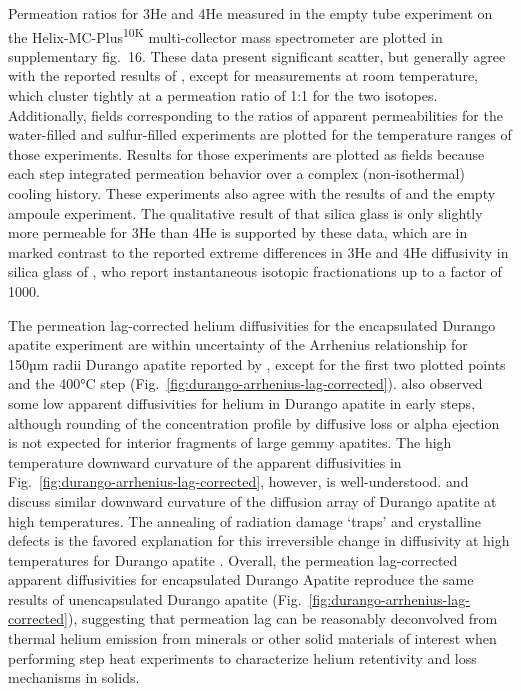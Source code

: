 Permeation ratios for 3He and 4He measured in the empty tube experiment on the Helix-MC-Plus\textsuperscript{10K} multi-collector mass spectrometer are plotted in supplementary fig.~16. These data present significant scatter, but generally agree with the reported results of \citet{jones1953}, except for measurements at room temperature, which cluster tightly at a permeation ratio of 1:1 for the two isotopes. Additionally, fields corresponding to the ratios of apparent permeabilities for the water-filled and sulfur-filled experiments are plotted for the temperature ranges of those experiments. Results for those experiments are plotted as fields because each step integrated permeation behavior over a complex (non-isothermal) cooling history. These experiments also agree with the results of \citet{jones1953} and the empty ampoule experiment. The qualitative result of \citet{jones1953} that silica glass is only slightly more permeable for 3He than 4He is supported by these data, which are in marked contrast to the reported extreme differences in 3He and 4He diffusivity in silica glass of \citet{mcmurtry2019}, who report instantaneous isotopic fractionations up to a factor of 1000.

The permeation lag-corrected helium diffusivities for the encapsulated Durango apatite experiment are within uncertainty of the Arrhenius relationship for 150µm radii Durango apatite reported by \citet{farley2000}, except for the first two plotted points and the 400°C step (Fig.~\ref{fig:durango-arrhenius-lag-corrected}). \citet{farley2000} also observed some low apparent diffusivities for helium in Durango apatite in early steps, although rounding of the concentration profile by diffusive loss or alpha ejection is not expected for interior fragments of large gemmy apatites. The high temperature downward curvature of the apparent diffusivities in Fig.~\ref{fig:durango-arrhenius-lag-corrected}, however, is well-understood. \citet{wolf1996} and \citet{farley2000} discuss similar downward curvature of the diffusion array of Durango apatite at high temperatures. The annealing of radiation damage `traps' and crystalline defects is the favored explanation for this irreversible change in diffusivity at high temperatures for Durango apatite \citep{farley2000,shuster2006}. Overall, the permeation lag-corrected apparent diffusivities for encapsulated Durango Apatite reproduce the same results of unencapsulated Durango apatite (Fig.~\ref{fig:durango-arrhenius-lag-corrected}), suggesting that permeation lag can be reasonably deconvolved from thermal helium emission from minerals or other solid materials of interest when performing step heat experiments to characterize helium retentivity and loss mechanisms in solids.

